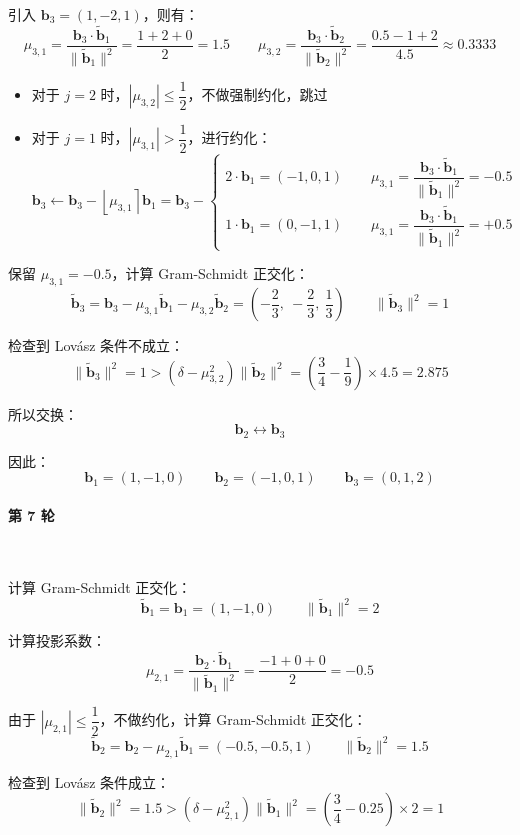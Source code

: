 \documentclass{article}
\begin{document}
引入 $\bm{b}_3=(1,-2,1)$，则有：
\[ \mu_{3,1}=\dfrac{\bm{b}_3\cdot\tilde{\bm{b}}_1}{\|\tilde{\bm{b}}_1\|^2}=\dfrac{1+2+0}{2}=1.5\qquad\mu_{3,2}=\dfrac{\bm{b}_3\cdot\tilde{\bm{b}}_2}{\|\tilde{\bm{b}}_2\|^2}=\dfrac{0.5-1+2}{4.5}\approx0.3333 \]

\begin{itemize}
    \item 对于 $j=2$ 时，$|\mu_{3,2}|\leqslant\dfrac{1}{2}$，不做强制约化，跳过
    \item 对于 $j=1$ 时，$|\mu_{3,1}|>\dfrac{1}{2}$，进行约化：
    \[ \bm{b}_3\leftarrow\bm{b}_3-\left\lfloor\mu_{3,1}\right\rceil\bm{b}_1=\bm{b}_3-\begin{cases}
        2\cdot\bm{b}_1=(-1,0,1)\qquad\mu_{3,1}=\dfrac{\bm{b}_3\cdot\tilde{\bm{b}}_1}{\|\tilde{\bm{b}}_1\|^2}=-0.5
        \\[10pt]
        1\cdot\bm{b}_1=(0,-1,1)\qquad\mu_{3,1}=\dfrac{\bm{b}_3\cdot\tilde{\bm{b}}_1}{\|\tilde{\bm{b}}_1\|^2}=+0.5
    \end{cases} \]
\end{itemize}

保留 $\mu_{3,1}=-0.5$，计算 Gram-Schmidt 正交化：
\[ \tilde{\bm{b}}_3=\bm{b}_3-\mu_{3,1}\tilde{\bm{b}}_1-\mu_{3,2}\tilde{\bm{b}}_2=\left(-\dfrac{2}{3},\ -\dfrac{2}{3},\ \dfrac{1}{3}\right)\qquad\|\tilde{\bm{b}}_3\|^2=1 \]

检查到 Lov\'asz 条件不成立：
\[ \|\tilde{\bm{b}}_{3}\|^2=1>(\delta-\mu_{3,2}^2)\|\tilde{\bm{b}}_{2}\|^2=\left(\dfrac{3}{4}-\dfrac{1}{9}\right)\times4.5=2.875 \]

所以交换：
\[ \bm{b}_2\leftrightarrow\bm{b}_3 \]

因此：
\[ \bm{b}_1=(1,-1,0)\qquad\bm{b}_2=(-1,0,1)\qquad\bm{b}_3=(0,1,2) \]

\paragraph*{第 7 轮}~{}

计算 Gram-Schmidt 正交化：
\[ \tilde{\bm{b}}_1=\bm{b}_1=(1,-1,0)\qquad \|\tilde{\bm{b}}_1\|^2=2 \]

计算投影系数：
\[ \mu_{2,1}=\dfrac{\bm{b}_2\cdot\tilde{\bm{b}}_1}{\|\tilde{\bm{b}}_1\|^2}=\dfrac{-1+0+0}{2}=-0.5 \]

由于 $|\mu_{2,1}|\leqslant\dfrac{1}{2}$，不做约化，计算 Gram-Schmidt 正交化：
\[ \tilde{\bm{b}}_2=\bm{b}_2-\mu_{2,1}\tilde{\bm{b}}_1=(-0.5,-0.5,1)\qquad\|\tilde{\bm{b}}_2\|^2=1.5 \]

检查到 Lov\'asz 条件成立：
\[ \|\tilde{\bm{b}}_{2}\|^2=1.5>(\delta-\mu_{2,1}^2)\|\tilde{\bm{b}}_{1}\|^2=\left(\dfrac{3}{4}-0.25\right)\times2=1 \]
\end{document}
